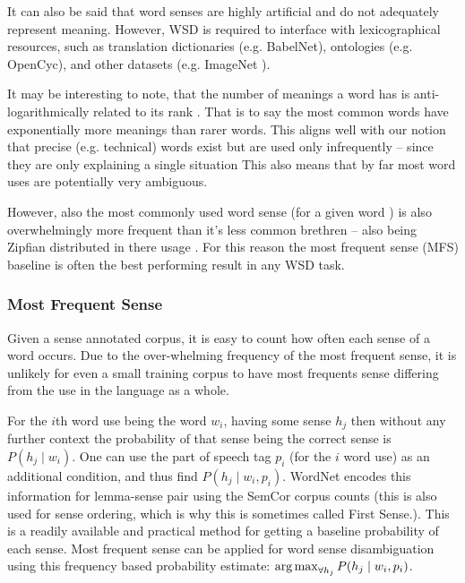 \documentclass[12pt,parskip]{komatufte}
\begin{document}
It can also be said that word senses are highly artificial and do not adequately represent meaning.
However, WSD is required to interface with  lexicographical resources,
such as translation dictionaries (e.g. BabelNet), ontologies (e.g. OpenCyc), and other datasets (e.g. ImageNet ).


It may be interesting to note, that the number of meanings a word has is anti-logarithmically related to its rank .
That is to say the most common words have exponentially more meanings than rarer words.
This aligns well with our notion that precise (e.g. technical) words exist but are used only infrequently -- since they are only explaining a single situation
This also means that by far most word uses are potentially very ambiguous.

However, also the most commonly used word sense (for a given word ) is also overwhelmingly more frequent than it's less common brethren -- also being Zipfian distributed in there usage \cite{Kilgarriff2004}.
For this reason the most frequent sense (MFS) baseline is often the best performing result in any WSD task.

\subsubsection{Most Frequent Sense}\label{sec:most-frequent-sense}
Given a sense annotated corpus, it is easy to count how often each sense of a word occurs.
Due to the over-whelming frequency of the most frequent sense, it is unlikely for even a small training corpus to have most frequents sense differing from the use in the language as a whole.


For the $i$th word use being the word $w_i$, having some sense $h_j$
then without any further context the 
probability of that sense being the correct sense is $P(h_j \mid w_i)$.
One can use the part of speech tag $p_i$ (for the $i$ word use) as an additional condition, and thus find $P(h_j \mid w_i, p_i)$.
WordNet encodes this information for lemma-sense pair using the SemCor corpus counts (this is also used for sense ordering, which is why this is sometimes called First Sense.).
This is a readily available and practical method for getting a baseline probability of each sense.
Most frequent sense can be applied for word sense disambiguation using this frequency based probability estimate:  $\operatorname*{arg\,max}_{\forall h_j} P(h_j \mid w_i, p_i)$.
\end{document}
